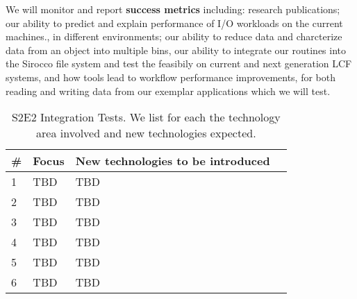 We will monitor and report {\bf success metrics} including: 
research publications;
our ability to predict and explain performance of I/O workloads on the current machines., in different environments;
our ability to reduce data and charcterize data from an object into multiple bins, 
our ability to integrate our routines into the Sirocco file system and test the feasibily on current and next generation LCF systems, and
how tools lead to workflow performance improvements, for both reading and writing data from our exemplar applications which we will test.

\begin{table}[t]
\caption{S2E2 Integration Tests. We list for each the technology area involved and new technologies expected.}
\centering \footnotesize
\vspace{2ex}
\label{tab:ifests}
\begin{tabular}{| l | l |l |l |} 
\hline
{\bf \#} &  {\bf Focus} & {\bf New technologies to be introduced} \\\hline
1 & TBD			 & TBD\ \ \\
2 &TBD & TBD\\
3 & TBD         & TBD \\
4 & TBD                                    & TBD  \\
5 & TBD                                    & TBD \\
6 & TBD                                    & TBD  \\\hline
\end{tabular}
\vspace{-8ex}
\end{table}
